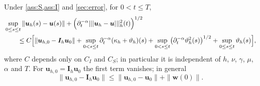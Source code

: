 \begin{theorem}\label{thm:err}
Under \cref{ass:S,ass:I} and \eqref{sec:error}, for $0<t\le T$,
\begin{equation}\label{eq:err-main}
\begin{aligned}
&\sup_{0\le s\le t}\|\bm u_h(s)-\bm u(s)\|+\Bigl(\partial_t^{-\alpha}|||\bm u_h-\bm u|||_h^2(t)\Bigr)^{1/2}\\
&\qquad\le C\Bigl[\|\bm u_{h,0}-\bm I_h\bm u_0\|+\sup_{0<s\le t}\partial_t^{-\alpha}(\kappa_h+\vartheta_h)(s)+\sup_{0<s\le t}\bigl(\partial_t^{-\alpha}\vartheta_h^2(s)\bigr)^{1/2}+\sup_{0\le s\le t}\vartheta_h(s)\Bigr],
\end{aligned}
\end{equation}
where $C$ depends only on $C_I$ and $C_S$; in particular it is independent of $h$, $\nu$, $\gamma$, $\mu$, $\alpha$ and $T$. For $\bm u_{h,0}=\bm I_h\bm u_0$ the first term vanishes; in general
\[
\|\bm u_{h,0}-\bm I_h\bm u_0\|\le\|\bm u_{h,0}-\bm u_0\|+\|\bm w(0)\| .
\]
\end{theorem}
